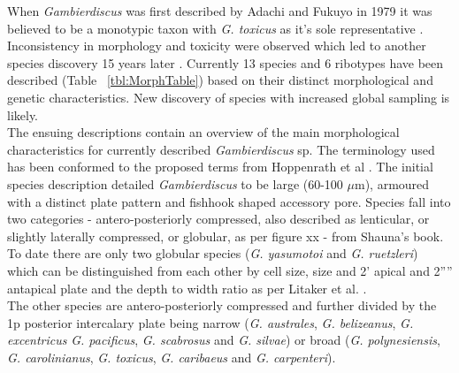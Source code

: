\documentclass[12pt]{article}
\begin{document}
When \emph{Gambierdiscus} was first described by Adachi and Fukuyo in 1979 it was believed to be a monotypic taxon with \emph{G. toxicus} as it's sole representative \cite{adachi1979thecal}. Inconsistency in morphology and toxicity were observed which led to another species discovery 15 years later \cite{faust1995observation,holmes1990toxicity,holmes1991strain,chinain1997intraspecific,richlen2008phylogeography,bomber1988epiphytic,bomber1989epiphytism,bomber1989genitic,morton1993response}. Currently 13 species and 6 ribotypes have been described (Table ~\ref{tbl:MorphTable}) based on their distinct morphological and genetic characteristics. New discovery of species with increased global sampling is likely. \\

The ensuing descriptions contain an overview of the main morphological characteristics for currently described \emph{Gambierdiscus} sp. The terminology used has been conformed to the proposed terms from Hoppenrath et al \cite{hoppenrath2013taxonomy}. The initial species description detailed \emph{Gambierdiscus} to be large (60-100 $\mu$m), armoured with a distinct plate pattern and fishhook shaped accessory pore. Species fall into two categories - antero-posteriorly compressed, also described as lenticular, or slightly laterally compressed, or globular, as per figure xx - from Shauna's book. %
To date there are only two globular species (\emph{G. yasumotoi} and \emph{G. ruetzleri}) which can be distinguished from each other by cell size, size and 2' apical and 2'''' antapical plate and the depth to width ratio as per Litaker et al. \cite{litaker2009taxonomy}. \\
The other species are antero-posteriorly compressed and further divided by the 1p posterior intercalary plate being narrow (\emph{G. australes}, \emph{G. belizeanus}, \emph{G. excentricus} \emph{G. pacificus}, \emph{G. scabrosus} and \emph{G. silvae}) or broad (\emph{G. polynesiensis}, \emph{G. carolinianus}, \emph{G. toxicus}, \emph{G. caribaeus} and \emph{G. carpenteri}). \\
\end{document}
